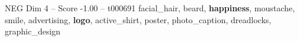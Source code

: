 \begin{textsample}{NEG Dim 4 – Score -1.00 – t000691}  \label{ex:f4_neg_032}
facial\_hair, beard, \textbf{happiness}, moustache, smile, advertising, \textbf{logo}, active\_shirt, poster, photo\_caption, dreadlocks, graphic\_design

\end{textsample}
